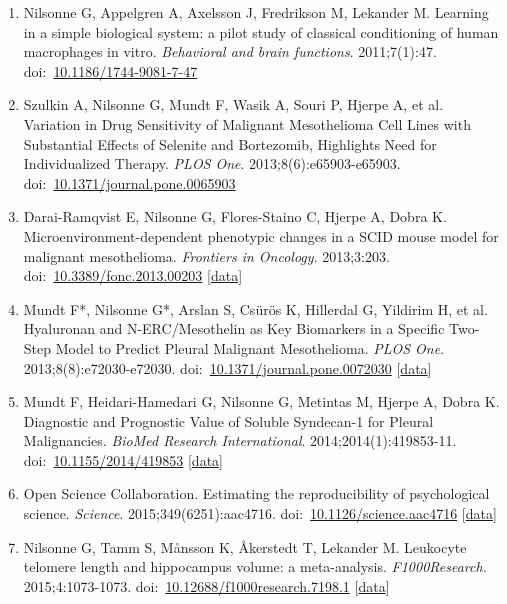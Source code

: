 \documentclass[10pt,a4paper,twocolumn]{article}
\begin{document}
\begin{enumerate}
    \item Nilsonne G, Appelgren A, Axelsson J, Fredrikson M, Lekander M. Learning in a simple biological system: a pilot study of classical conditioning of human macrophages in vitro. \textit{Behavioral and brain functions}. 2011;7(1):47. doi:~\href{https://doi.org/10.1186/1744-9081-7-47}{10.1186/1744-9081-7-47}

    \item Szulkin A, Nilsonne G, Mundt F, Wasik A, Souri P, Hjerpe A, et al. Variation in Drug Sensitivity of Malignant Mesothelioma Cell Lines with Substantial Effects of Selenite and Bortezomib, Highlights Need for Individualized Therapy. \textit{PLOS One}. 2013;8(6):e65903-e65903. doi:~\href{https://doi.org/10.1371/journal.pone.0065903}{10.1371/journal.pone.0065903}

    \item Darai-Ramqvist E, Nilsonne G, Flores-Staino C, Hjerpe A, Dobra K. Microenvironment-dependent phenotypic changes in a SCID mouse model for malignant mesothelioma. \textit{Frontiers in Oncology}. 2013;3:203. doi:~\href{https://doi.org/10.3389/fonc.2013.00203}{10.3389/fonc.2013.00203} [\href{http://www.ncbi.nlm.nih.gov/geo/query/acc.cgi?acc=GSE48019}{data}]

    \item Mundt F*, Nilsonne G*, Arslan S, Csürös K, Hillerdal G, Yildirim H, et al. Hyaluronan and N-ERC/Mesothelin as Key Biomarkers in a Specific Two-Step Model to Predict Pleural Malignant Mesothelioma. \textit{PLOS One}. 2013;8(8):e72030-e72030. doi:~\href{https://doi.org/10.1371/journal.pone.0072030}{10.1371/journal.pone.0072030} [\href{http://dx.doi.org/10.5061/dryad.h122b}{data}]

    \item Mundt F, Heidari-Hamedari G, Nilsonne G, Metintas M, Hjerpe A, Dobra K. Diagnostic and Prognostic Value of Soluble Syndecan-1 for Pleural Malignancies. \textit{BioMed Research International}. 2014;2014(1):419853-11. doi:~\href{https://doi.org/10.1155/2014/419853}{10.1155/2014/419853} [\href{http://dx.doi.org/10.5061/dryad.c42t7}{data}]

    \item Open Science Collaboration. Estimating the reproducibility of psychological science. \textit{Science}. 2015;349(6251):aac4716. doi:~\href{https://doi.org/10.1126/science.aac4716}{10.1126/science.aac4716} [\href{https://osf.io/ezcuj}{data}]

    \item Nilsonne G, Tamm S, Månsson K, Åkerstedt T, Lekander M. Leukocyte telomere length and hippocampus volume: a meta-analysis. \textit{F1000Research}. 2015;4:1073-1073. doi:~\href{https://doi.org/10.12688/f1000research.7198.1}{10.12688/f1000research.7198.1} [\href{http://dx.doi.org/10.5281/zenodo.31771}{data}]


\end{enumerate}
\end{document}
